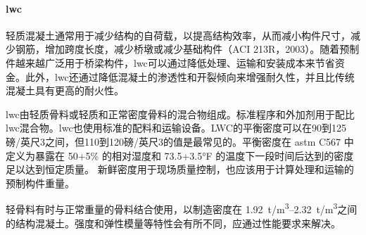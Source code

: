 \paragraph{\acrfull*{lwc}}
轻质混凝土通常用于减少结构的自荷载，以提高结构效率，从而减小构件尺寸，减少钢筋，增加跨度长度，减少桥墩或减少基础构件（ACI 213R，2003）。随着预制件越来越广泛用于桥梁构件，\acrlong*{lwc}可以通过降低处理、运输和安装成本来节省资金。此外，\acrlong*{lwc}还通过降低混凝土的渗透性和开裂倾向来增强耐久性，并且比传统混凝土具有更高的耐火性。

\acrlong*{lwc}由轻质骨料或轻质和正常密度骨料的混合物组成。标准程序和外加剂用于配比\acrlong*{lwc}混合物。\acrlong*{lwc}也使用标准的配料和运输设备。LWC的平衡密度可以在90到125磅/英尺3之间，但110到120磅/英尺3的值是最常见的。平衡密度在 \acrshort*{astm} C567 中定义为暴露在 50+5\% 的相对湿度和 73.5+3.5°F 的温度下一段时间后达到的密度足以达到恒定质量。 新鲜密度用于现场质量控制，也应该用于计算处理和运输的预制构件重量。

轻骨料有时与正常重量的骨料结合使用，以制造密度在 \qtyrange{1.92}{2.32}{t/m^3}之间的结构混凝土。强度和弹性模量等特性会有所不同，应通过性能要求来解决。

